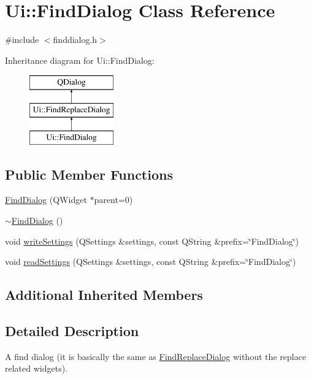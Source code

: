 \hypertarget{class_ui_1_1_find_dialog}{}\section{Ui\+:\+:Find\+Dialog Class Reference}
\label{class_ui_1_1_find_dialog}


{\ttfamily \#include $<$finddialog.\+h$>$}

Inheritance diagram for Ui\+:\+:Find\+Dialog\+:\begin{figure}[H]
\begin{center}
\leavevmode
\includegraphics[height=3.000000cm]{class_ui_1_1_find_dialog}
\end{center}
\end{figure}
\subsection*{Public Member Functions}
\begin{DoxyCompactItemize}
\item 
\hyperlink{class_ui_1_1_find_dialog_af9dc0e86bec39e9b3a0b954a603a8e76}{Find\+Dialog} (Q\+Widget $\ast$parent=0)
\item 
\hyperlink{class_ui_1_1_find_dialog_ad558e82173272809593fb557f6ec88b0}{$\sim$\+Find\+Dialog} ()
\item 
void \hyperlink{class_ui_1_1_find_dialog_a8d54b1576e6325b41e5989fa2cec0d26}{write\+Settings} (Q\+Settings \&settings, const Q\+String \&prefix=\char`\"{}Find\+Dialog\char`\"{})
\item 
void \hyperlink{class_ui_1_1_find_dialog_adcb3b60f3a1a4a41f7edddf7b203ba44}{read\+Settings} (Q\+Settings \&settings, const Q\+String \&prefix=\char`\"{}Find\+Dialog\char`\"{})
\end{DoxyCompactItemize}
\subsection*{Additional Inherited Members}


\subsection{Detailed Description}
A find dialog (it is basically the same as \hyperlink{class_ui_1_1_find_replace_dialog}{Find\+Replace\+Dialog} without the replace related widgets). 

